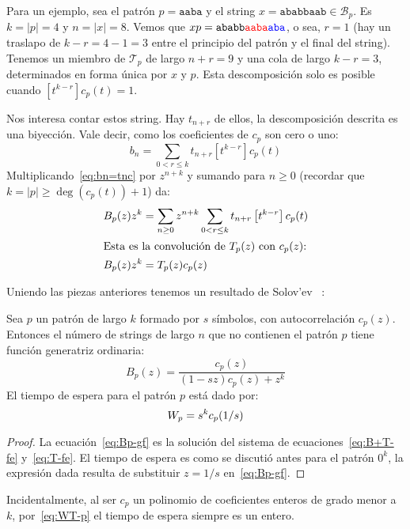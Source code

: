   Para un ejemplo,
  sea el patrón \(p = \mathtt{a a b a}\)
  y el \foreignlanguage{english}{string}
    \(x = \mathtt{a b a b b a a b} \in \mathcal{B}_p\).
  Es \(k = \lvert p \rvert = 4\)
  y \(n = \lvert x \rvert = 8\).
  Vemos que
    \(x p = \mathtt{a b a b b
		    \textcolor{red}{a a b a}
		    \textcolor{blue}{a b a}}\),
  o sea,
  \(r = 1\)
  (hay un traslapo de \(k - r = 4 - 1 = 3\)
   entre el principio del patrón
   y el final del \foreignlanguage{english}{string}).
  Tenemos un miembro de \(\mathcal{T}_p\) de largo \(n + r = 9\)
  y una cola de largo \(k - r = 3\),
  determinados en forma única por \(x\) y \(p\).
  Esta descomposición solo es posible cuando
  \(\left[ t^{k - r} \right] c_p (t) = 1\).

  Nos interesa contar estos \foreignlanguage{english}{string}.
  Hay \(t_{n + r}\) de ellos,
  la descomposición descrita es una biyección.
  Vale decir,
  como los coeficientes de \(c_p\) son cero o uno:
  \begin{equation}
    \label{eq:bn=tnc}
    b_n
      = \sum_{0 < r \le k}
	  t_{n + r} \left[ t^{k - r} \right] c_p (t)
  \end{equation}
  Multiplicando~\eqref{eq:bn=tnc}
  por \(z^{n + k}\) y sumando para \(n \ge 0\)
  (recordar que \(k = \lvert p \rvert \ge \deg(c_p(t)) + 1\))
  da:
  \begin{align}
    B_p(z) z^k
      &= \sum_{n \ge 0}
	   z^{n + k}
	   \sum_{0 < r \le k}
	     t_{n + r}
	     \left[ t^{k - r} \right] c_p (t)
		 \notag \\
  \intertext{Esta es la convolución de \(T_p(z)\) con \(c_p(z)\):}
    B_p(z) z^k
      &= T_p(z) c_p(z) \label{eq:T-fe}
  \end{align}

  Uniendo las piezas anteriores
  tenemos un resultado de Solov'ev~%
    \cite{solovev66:_combin_ident_its_applic_probl}:
  \begin{theorem}
    \label{theo:Bp-gf}
    Sea \(p\) un patrón de largo \(k\) formado por \(s\) símbolos,
    con autocorrelación \(c_p(z)\).
    Entonces
    el número de \foreignlanguage{english}{strings} de largo \(n\)
    que no contienen el patrón \(p\)
    tiene función generatriz ordinaria:
    \begin{equation}
      \label{eq:Bp-gf}
      B_p(z)
	= \frac{c_p(z)}{(1 - s z) c_p(z) + z^k}
    \end{equation}
    El tiempo de espera para el patrón \(p\)%
    está dado por:
    \begin{equation}
      \label{eq:WT-p}
      W_p
	= s^k c_p (1 / s)
    \qedhere
    \end{equation}
  \end{theorem}
  \begin{proof}
    La ecuación~\eqref{eq:Bp-gf}
    es la solución del sistema de ecuaciones~\eqref{eq:B+T-fe}
    y~\eqref{eq:T-fe}.
    El tiempo de espera
    es como se discutió antes para el patrón \(0^k\),
    la expresión dada
    resulta de substituir \(z = 1 / s\) en~\eqref{eq:Bp-gf}.
  \end{proof}
  Incidentalmente,
  al ser \(c_p\)
  un polinomio de coeficientes enteros de grado menor a \(k\),
  por~\eqref{eq:WT-p} el tiempo de espera siempre es un entero.

